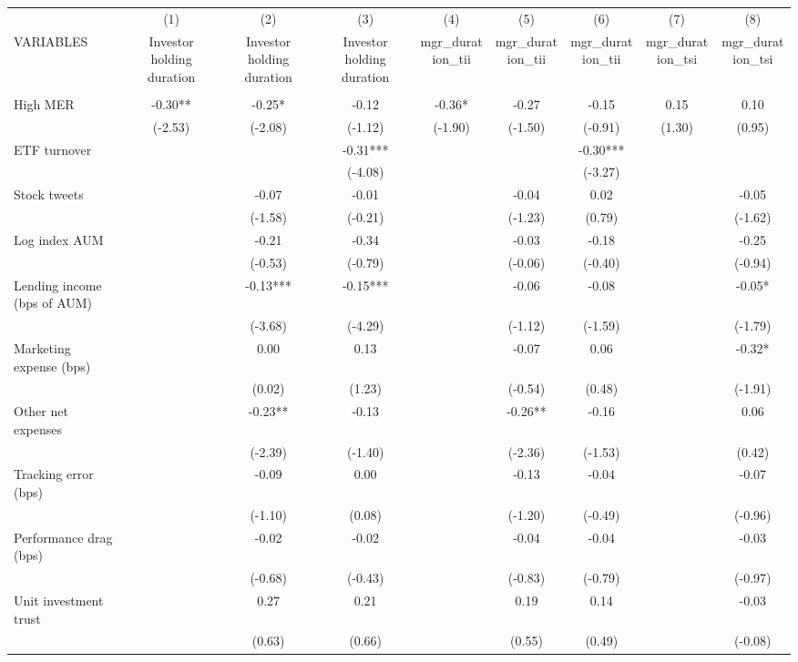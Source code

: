 \documentclass[]{article}
\begin{document}
\begin{tabular}{lcccccccc} \hline
 & (1) & (2) & (3) & (4) & (5) & (6) & (7) & (8) \\
VARIABLES & Investor holding duration & Investor holding duration & Investor holding duration & mgr\_duration\_tii & mgr\_duration\_tii & mgr\_duration\_tii & mgr\_duration\_tsi & mgr\_duration\_tsi \\ \hline
 &  &  &  &  &  &  &  &  \\
High MER & -0.30** & -0.25* & -0.12 & -0.36* & -0.27 & -0.15 & 0.15 & 0.10 \\
 & (-2.53) & (-2.08) & (-1.12) & (-1.90) & (-1.50) & (-0.91) & (1.30) & (0.95) \\
ETF turnover &  &  & -0.31*** &  &  & -0.30*** &  &  \\
 &  &  & (-4.08) &  &  & (-3.27) &  &  \\
Stock tweets &  & -0.07 & -0.01 &  & -0.04 & 0.02 &  & -0.05 \\
 &  & (-1.58) & (-0.21) &  & (-1.23) & (0.79) &  & (-1.62) \\
Log index AUM &  & -0.21 & -0.34 &  & -0.03 & -0.18 &  & -0.25 \\
 &  & (-0.53) & (-0.79) &  & (-0.06) & (-0.40) &  & (-0.94) \\
Lending income (bps of AUM) &  & -0.13*** & -0.15*** &  & -0.06 & -0.08 &  & -0.05* \\
 &  & (-3.68) & (-4.29) &  & (-1.12) & (-1.59) &  & (-1.79) \\
Marketing expense (bps) &  & 0.00 & 0.13 &  & -0.07 & 0.06 &  & -0.32* \\
 &  & (0.02) & (1.23) &  & (-0.54) & (0.48) &  & (-1.91) \\
Other net expenses &  & -0.23** & -0.13 &  & -0.26** & -0.16 &  & 0.06 \\
 &  & (-2.39) & (-1.40) &  & (-2.36) & (-1.53) &  & (0.42) \\
Tracking error (bps) &  & -0.09 & 0.00 &  & -0.13 & -0.04 &  & -0.07 \\
 &  & (-1.10) & (0.08) &  & (-1.20) & (-0.49) &  & (-0.96) \\
Performance drag (bps) &  & -0.02 & -0.02 &  & -0.04 & -0.04 &  & -0.03 \\
 &  & (-0.68) & (-0.43) &  & (-0.83) & (-0.79) &  & (-0.97) \\
Unit investment trust &  & 0.27 & 0.21 &  & 0.19 & 0.14 &  & -0.03 \\
 &  & (0.63) & (0.66) &  & (0.55) & (0.49) &  & (-0.08) \\

\end{tabular}
\end{document}
